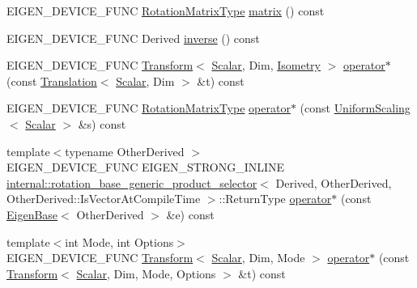 \begin{DoxyCompactItemize}
\item 
E\+I\+G\+E\+N\+\_\+\+D\+E\+V\+I\+C\+E\+\_\+\+F\+U\+NC \hyperlink{class_eigen_1_1_rotation_base_a83602509674c9d635551998460342951}{Rotation\+Matrix\+Type} \hyperlink{class_eigen_1_1_rotation_base_a14ce23df5f0b2593a466f8130fe6bac9}{matrix} () const
\item 
E\+I\+G\+E\+N\+\_\+\+D\+E\+V\+I\+C\+E\+\_\+\+F\+U\+NC Derived \hyperlink{class_eigen_1_1_rotation_base_a2835ea92940986b4220cf47538a6bc41}{inverse} () const
\item 
E\+I\+G\+E\+N\+\_\+\+D\+E\+V\+I\+C\+E\+\_\+\+F\+U\+NC \hyperlink{group___geometry___module_class_eigen_1_1_transform}{Transform}$<$ \hyperlink{class_eigen_1_1_rotation_base_af9b43eac462d7aa70b018efd49c13ef4}{Scalar}, Dim, \hyperlink{group__enums_ggaee59a86102f150923b0cac6d4ff05107a080cd5366173608f701cd945c2335568}{Isometry} $>$ \hyperlink{class_eigen_1_1_rotation_base_a4b09a2174ee14f0aa71bc0285c9045a9}{operator$\ast$} (const \hyperlink{group___geometry___module_class_eigen_1_1_translation}{Translation}$<$ \hyperlink{class_eigen_1_1_rotation_base_af9b43eac462d7aa70b018efd49c13ef4}{Scalar}, Dim $>$ \&t) const
\item 
E\+I\+G\+E\+N\+\_\+\+D\+E\+V\+I\+C\+E\+\_\+\+F\+U\+NC \hyperlink{class_eigen_1_1_rotation_base_a83602509674c9d635551998460342951}{Rotation\+Matrix\+Type} \hyperlink{class_eigen_1_1_rotation_base_ad7b31a12a4f8f2584b8937f958bd6ea6}{operator$\ast$} (const \hyperlink{class_eigen_1_1_uniform_scaling}{Uniform\+Scaling}$<$ \hyperlink{class_eigen_1_1_rotation_base_af9b43eac462d7aa70b018efd49c13ef4}{Scalar} $>$ \&s) const
\item 
{\footnotesize template$<$typename Other\+Derived $>$ }\\E\+I\+G\+E\+N\+\_\+\+D\+E\+V\+I\+C\+E\+\_\+\+F\+U\+NC E\+I\+G\+E\+N\+\_\+\+S\+T\+R\+O\+N\+G\+\_\+\+I\+N\+L\+I\+NE \hyperlink{struct_eigen_1_1internal_1_1rotation__base__generic__product__selector}{internal\+::rotation\+\_\+base\+\_\+generic\+\_\+product\+\_\+selector}$<$ Derived, Other\+Derived, Other\+Derived\+::\+Is\+Vector\+At\+Compile\+Time $>$\+::Return\+Type \hyperlink{class_eigen_1_1_rotation_base_a68d8b53d31bcfa9fd6b0e24a061bea6c}{operator$\ast$} (const \hyperlink{group___core___module_struct_eigen_1_1_eigen_base}{Eigen\+Base}$<$ Other\+Derived $>$ \&e) const
\item 
{\footnotesize template$<$int Mode, int Options$>$ }\\E\+I\+G\+E\+N\+\_\+\+D\+E\+V\+I\+C\+E\+\_\+\+F\+U\+NC \hyperlink{group___geometry___module_class_eigen_1_1_transform}{Transform}$<$ \hyperlink{class_eigen_1_1_rotation_base_af9b43eac462d7aa70b018efd49c13ef4}{Scalar}, Dim, Mode $>$ \hyperlink{class_eigen_1_1_rotation_base_adf1097a616f0ebf7e78eea9598697672}{operator$\ast$} (const \hyperlink{group___geometry___module_class_eigen_1_1_transform}{Transform}$<$ \hyperlink{class_eigen_1_1_rotation_base_af9b43eac462d7aa70b018efd49c13ef4}{Scalar}, Dim, Mode, Options $>$ \&t) const

\end{DoxyCompactItemize}
